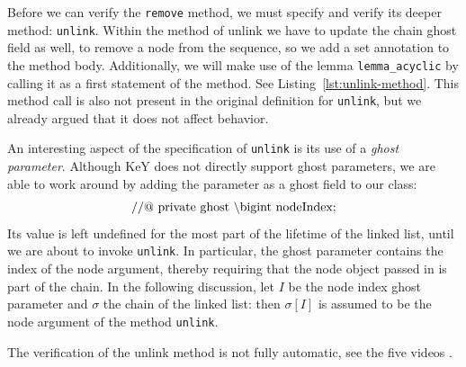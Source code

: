 \documentclass[runningheads]{llncs}
\def\bs{\char092}
\begin{document}
Before we can verify the \texttt{remove} method, we must specify and verify its deeper method: \texttt{unlink}. Within the method of unlink we have to update the chain ghost field as well, to remove a node from the sequence, so we add a set annotation to the method body. Additionally, we will make use of the lemma \texttt{lemma\_acyclic} by calling it as a first statement of the method. See Listing~\ref{lst:unlink-method}. This method call is also not present in the original definition for \texttt{unlink}, but we already argued that it does not affect behavior.



An interesting aspect of the specification of \texttt{unlink} is its use of a \emph{ghost parameter}. Although KeY does not directly support ghost parameters, we are able to work around by adding the parameter as a ghost field to our class:
$$\mathrm{//@\ private\ ghost\ \bs bigint\ nodeIndex;}$$
Its value is left undefined for the most part of the lifetime of the linked list, until we are about to invoke \texttt{unlink}. In particular, the ghost parameter contains the index of the node argument, thereby requiring that the node object passed in is part of the chain. In the following discussion, let $I$ be the node index ghost parameter and $\sigma$ the chain of the linked list: then $\sigma[I]$ is assumed to be the node argument of the method \texttt{unlink}.

The verification of the unlink method is not fully automatic, see the five videos .
\end{document}
